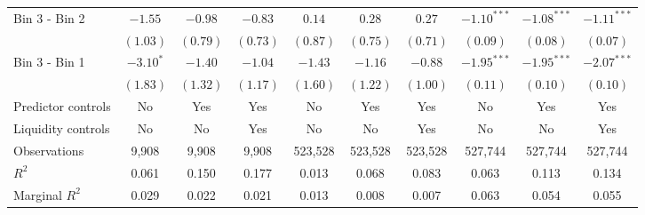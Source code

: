 \begin{tabular}{lccccccccc}
  Bin 3 - Bin 2 & $-1.55$ & $-0.98$ & $-0.83$ & $0.14$ & $0.28$ & $0.27$ & $-1.10^{***}$ & $-1.08^{***}$ & $-1.11^{***}$ \\

   & $(1.03)$ & $(0.79)$ & $(0.73)$ & $(0.87)$ & $(0.75)$ & $(0.71)$ & $(0.09)$ & $(0.08)$ & $(0.07)$ \\

  Bin 3 - Bin 1 & $-3.10^{*}$ & $-1.40$ & $-1.04$ & $-1.43$ & $-1.16$ & $-0.88$ & $-1.95^{***}$ & $-1.95^{***}$ & $-2.07^{***}$ \\

   & $(1.83)$ & $(1.32)$ & $(1.17)$ & $(1.60)$ & $(1.22)$ & $(1.00)$ & $(0.11)$ & $(0.10)$ & $(0.10)$ \\

  \hline

  Predictor controls & No & Yes & Yes & No & Yes & Yes & No & Yes & Yes \\

  Liquidity controls & No & No & Yes & No & No & Yes & No & No & Yes \\

  Observations & 9,908 & 9,908 & 9,908 & 523,528 & 523,528 & 523,528 & 527,744 & 527,744 & 527,744 \\

  $R^2$ & 0.061 & 0.150 & 0.177 & 0.013 & 0.068 & 0.083 & 0.063 & 0.113 & 0.134 \\

  Marginal $R^2$ & 0.029 & 0.022 & 0.021 & 0.013 & 0.008 & 0.007 & 0.063 & 0.054 & 0.055 \\

  \hline

\end{tabular}

